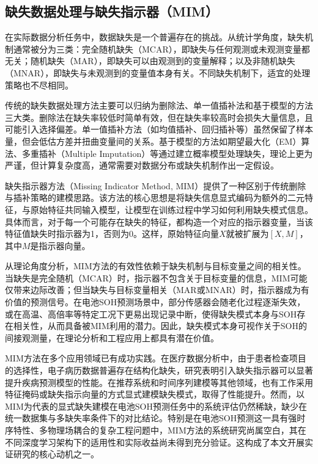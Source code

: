\documentclass[10pt,a4paper]{ctexart}
\begin{document}
\subsection{缺失数据处理与缺失指示器（MIM）}

在实际数据分析任务中，数据缺失是一个普遍存在的挑战。从统计学角度，缺失机制通常被分为三类：完全随机缺失（MCAR），即缺失与任何观测或未观测变量都无关；随机缺失（MAR），即缺失可以由观测到的变量解释；以及非随机缺失（MNAR），即缺失与未观测到的变量值本身有关\cite{little2002statistical}。不同缺失机制下，适宜的处理策略也不尽相同。

传统的缺失数据处理方法主要可以归纳为删除法、单一值插补法和基于模型的方法三大类。删除法在缺失率较低时简单有效，但在缺失率较高时会损失大量信息，且可能引入选择偏差。单一值插补方法（如均值插补、回归插补等）虽然保留了样本量，但会低估方差并扭曲变量间的关系。基于模型的方法如期望最大化（EM）算法、多重插补（Multiple Imputation）等通过建立概率模型处理缺失，理论上更为严谨，但计算复杂度高，通常需要对数据分布或缺失机制作出一定假设。

缺失指示器方法（Missing Indicator Method, MIM）提供了一种区别于传统删除与插补策略的建模思路\cite{jones1996indicator,van2023missing}。该方法的核心思想是将缺失信息显式编码为额外的二元特征，与原始特征共同输入模型，让模型在训练过程中学习如何利用缺失模式信息\cite{ipsen2022deal}。具体而言，对于每一个可能存在缺失的特征，都构造一个对应的指示器变量，当该特征值缺失时指示器为1，否则为0。这样，原始特征向量$X$就被扩展为$[X, M]$，其中$M$是指示器向量。

从理论角度分析，MIM方法的有效性依赖于缺失机制与目标变量之间的相关性。当缺失是完全随机（MCAR）时，指示器不包含关于目标变量的信息，MIM可能仅带来边际改善；但当缺失与目标变量相关（MAR或MNAR）时，指示器成为有价值的预测信号。在电池SOH预测场景中，部分传感器会随老化过程逐渐失效，或在高温、高倍率等特定工况下更易出现记录中断，使得缺失模式本身与SOH存在相关性，从而具备被MIM利用的潜力。因此，缺失模式本身可视作关于SOH的间接观测量，在理论分析和工程应用上都具有潜在价值。

MIM方法在多个应用领域已有成功实践。在医疗数据分析中，由于患者检查项目的选择性，电子病历数据普遍存在结构化缺失，研究表明引入缺失指示器可以显著提升疾病预测模型的性能\cite{sisk2023imputation,ehrig2025imputation}。在推荐系统和时间序列建模等其他领域，也有工作采用特征掩码或缺失指示向量的方式显式建模缺失模式，取得了性能提升\cite{ipsen2022deal,che2018recurrent}。然而，以MIM为代表的显式缺失建模在电池SOH预测任务中的系统评估仍然稀缺，缺少在统一数据集与多缺失率条件下的对比结论。特别是在电池SOH预测这一具有强时序特性、多物理场耦合的复杂工程问题中，MIM方法的系统研究尚属空白，其在不同深度学习架构下的适用性和实际收益尚未得到充分验证。这构成了本文开展实证研究的核心动机之一。
\end{document}
